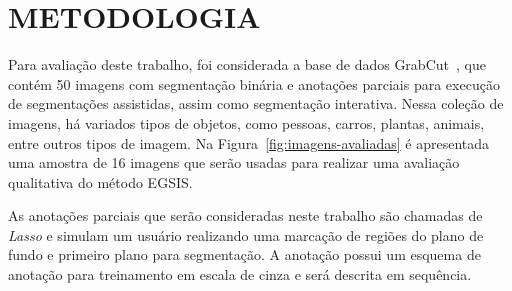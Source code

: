 \chapter{METODOLOGIA}\label{cap:metodologia}

Para avaliação deste trabalho, foi considerada a base de dados
GrabCut~\cite{rother2004grabcut}, que contém 50 imagens com
segmentação binária e anotações parciais para execução de segmentações
assistidas, assim como segmentação interativa. Nessa
coleção de imagens, há variados tipos de objetos, como pessoas,
carros, plantas, animais, entre outros tipos de imagem. Na Figura~\ref{fig:imagens-avaliadas} é
apresentada uma amostra de 16 imagens que serão usadas para realizar
uma avaliação qualitativa do método EGSIS.\@

\begin{figure}[h!]
        \captionsetup{width=16cm}
		\centering
        {}
\end{figure}
\FloatBarrier{}

As anotações parciais que serão consideradas neste trabalho são
chamadas de \textit{Lasso} e simulam um usuário realizando uma
marcação de regiões do plano de fundo e primeiro plano para
segmentação. A anotação possui um esquema de anotação para treinamento
em escala de cinza e será descrita em sequência.

